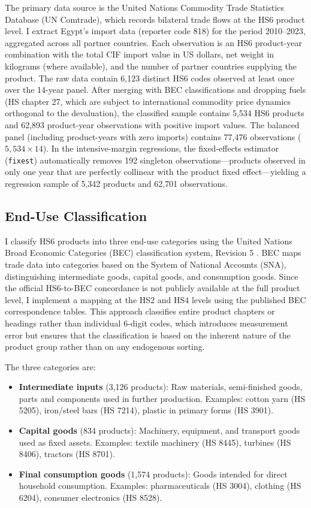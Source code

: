 \documentclass[12pt]{article}
\begin{document}
The primary data source is the United Nations Commodity Trade Statistics Database (UN Comtrade), which records bilateral trade flows at the HS6 product level. I extract Egypt's import data (reporter code 818) for the period 2010--2023, aggregated across all partner countries. Each observation is an HS6 product-year combination with the total CIF import value in US dollars, net weight in kilograms (where available), and the number of partner countries supplying the product. The raw data contain 6,123 distinct HS6 codes observed at least once over the 14-year panel. After merging with BEC classifications and dropping fuels (HS chapter 27, which are subject to international commodity price dynamics orthogonal to the devaluation), the classified sample contains 5,534 HS6 products and 62,893 product-year observations with positive import values. The balanced panel (including product-years with zero imports) contains 77,476 observations ($5{,}534 \times 14$). In the intensive-margin regressions, the fixed-effects estimator (\texttt{fixest}) automatically removes 192 singleton observations---products observed in only one year that are perfectly collinear with the product fixed effect---yielding a regression sample of 5,342 products and 62,701 observations.

\subsection{End-Use Classification}

I classify HS6 products into three end-use categories using the United Nations Broad Economic Categories (BEC) classification system, Revision 5 \citep{unstats2018bec}. BEC maps trade data into categories based on the System of National Accounts (SNA), distinguishing intermediate goods, capital goods, and consumption goods. Since the official HS6-to-BEC concordance is not publicly available at the full product level, I implement a mapping at the HS2 and HS4 levels using the published BEC correspondence tables. This approach classifies entire product chapters or headings rather than individual 6-digit codes, which introduces measurement error but ensures that the classification is based on the inherent nature of the product group rather than on any endogenous sorting.

The three categories are:
\begin{itemize}
\item \textbf{Intermediate inputs} (3,126 products): Raw materials, semi-finished goods, parts and components used in further production. Examples: cotton yarn (HS 5205), iron/steel bars (HS 7214), plastic in primary forms (HS 3901).
\item \textbf{Capital goods} (834 products): Machinery, equipment, and transport goods used as fixed assets. Examples: textile machinery (HS 8445), turbines (HS 8406), tractors (HS 8701).
\item \textbf{Final consumption goods} (1,574 products): Goods intended for direct household consumption. Examples: pharmaceuticals (HS 3004), clothing (HS 6204), consumer electronics (HS 8528).
\end{itemize}
\end{document}
